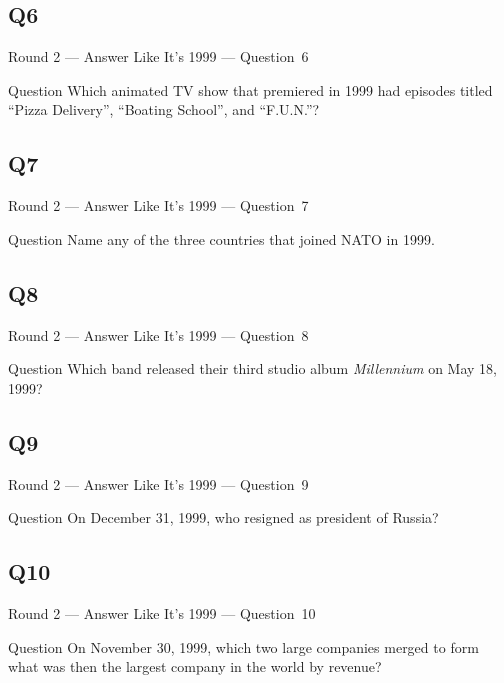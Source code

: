 \documentclass[11pt]{beamer}
\begin{document}
\subsection*{Q6}
\begin{frame}[t]{Round 2 --- Answer Like It's 1999 --- \mbox{Question 6}}
\vspace{-0.5em}
\begin{block}{Question}
Which animated TV show that premiered in 1999 had episodes titled ``Pizza Delivery'', ``Boating School'', and ``F.U.N.''?
\end{block}
\end{frame}
\subsection*{Q7}
\begin{frame}[t]{Round 2 --- Answer Like It's 1999 --- \mbox{Question 7}}
\vspace{-0.5em}
\begin{block}{Question}
Name any of the three countries that joined NATO in 1999.
\end{block}
\end{frame}
\subsection*{Q8}
\begin{frame}[t]{Round 2 --- Answer Like It's 1999 --- \mbox{Question 8}}
\vspace{-0.5em}
\begin{block}{Question}
Which band released their third studio album \emph{Millennium} on May 18, 1999?
\end{block}
\end{frame}
\subsection*{Q9}
\begin{frame}[t]{Round 2 --- Answer Like It's 1999 --- \mbox{Question 9}}
\vspace{-0.5em}
\begin{block}{Question}
On December 31, 1999, who resigned as president of Russia?
\end{block}
\end{frame}
\subsection*{Q10}
\begin{frame}[t]{Round 2 --- Answer Like It's 1999 --- \mbox{Question 10}}
\vspace{-0.5em}
\begin{block}{Question}
On November 30, 1999, which two large companies merged to form what was then the largest company in the world by revenue?
\end{block}
\end{frame}
\end{document}
